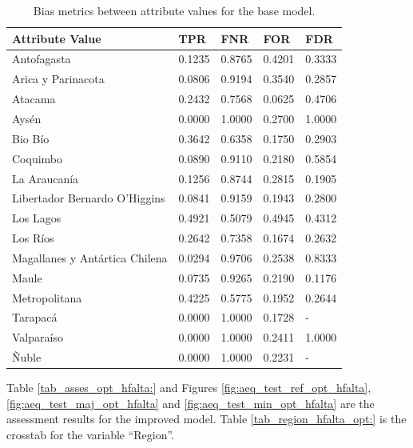 \documentclass[twoside,11pt]{article}
\begin{document}
\begin{table}[!htb]
\centering
\begin{tabular}{|p{3.5cm}|p{1cm}|p{1cm}|p{1cm}|p{1cm}|}
\hline

        \textbf{Attribute Value} &    \textbf{TPR} &    \textbf{FNR} &    \textbf{FOR} &    \textbf{FDR} \\
\hline
                   Antofagasta & 0.1235 & 0.8765 & 0.4201 & 0.3333 \\
            Arica y Parinacota & 0.0806 & 0.9194 & 0.3540 & 0.2857 \\
                       Atacama & 0.2432 & 0.7568 & 0.0625 & 0.4706 \\
                         Aysén & 0.0000 & 1.0000 & 0.2700 & 1.0000 \\
                       Bio Bío & 0.3642 & 0.6358 & 0.1750 & 0.2903 \\
                      Coquimbo & 0.0890 & 0.9110 & 0.2180 & 0.5854 \\
                  La Araucanía & 0.1256 & 0.8744 & 0.2815 & 0.1905 \\
 Libertador Bernardo O'Higgins & 0.0841 & 0.9159 & 0.1943 & 0.2800 \\
                     Los Lagos & 0.4921 & 0.5079 & 0.4945 & 0.4312 \\
                      Los Ríos & 0.2642 & 0.7358 & 0.1674 & 0.2632 \\
Magallanes y Antártica Chilena & 0.0294 & 0.9706 & 0.2538 & 0.8333 \\
                         Maule & 0.0735 & 0.9265 & 0.2190 & 0.1176 \\
                 Metropolitana & 0.4225 & 0.5775 & 0.1952 & 0.2644 \\
                      Tarapacá & 0.0000 & 1.0000 & 0.1728 &    - \\
                    Valparaíso & 0.0000 & 1.0000 & 0.2411 & 1.0000 \\
                         Ñuble & 0.0000 & 1.0000 & 0.2231 &    - \\

\hline
\end{tabular}
\caption{Bias metrics between attribute values for the base model.}
\label{tab_region_hfalta_base:}
\end{table}

Table \ref{tab_asses_opt_hfalta:} and Figures \ref{fig:aeq_test_ref_opt_hfalta}, \ref{fig:aeq_test_maj_opt_hfalta} and \ref{fig:aeq_test_min_opt_hfalta} are the assessment results for the improved model. Table  \ref{tab_region_hfalta_opt:} is the crosstab for the variable ``Region''.
\end{document}
